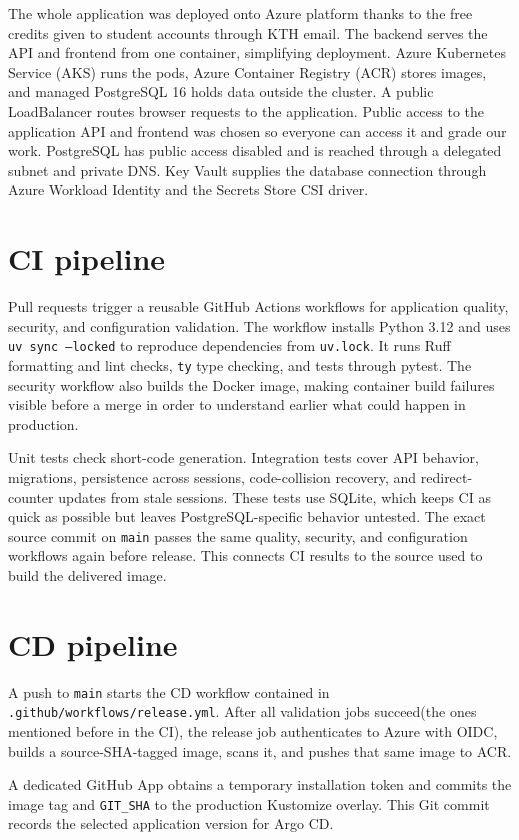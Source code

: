 \documentclass[10pt,a4paper]{article}
\newcommand{\file}[1]{\texttt{\nolinkurl{#1}}}
\begin{document}
The whole application was deployed onto Azure platform thanks to the free credits given to student accounts through KTH email.
The backend serves the API and frontend from one container, simplifying deployment. 
Azure Kubernetes Service (AKS) runs the pods, Azure Container Registry (ACR) stores images, and managed PostgreSQL 16 holds data outside the cluster.
A public LoadBalancer routes browser requests to the application. Public access to the application API and frontend was chosen so everyone can access it and grade our work.
PostgreSQL has public access disabled and is reached through a delegated subnet and private DNS. 
Key Vault supplies the database connection through Azure Workload Identity and the Secrets Store CSI driver.

\section{CI pipeline}
Pull requests trigger a reusable GitHub Actions workflows for application quality, security, and configuration validation. 
The workflow installs Python 3.12 and uses \texttt{uv sync --locked} to reproduce dependencies from \file{uv.lock}. 
It runs Ruff formatting and lint checks, \texttt{ty} type checking, and tests through pytest.
The security workflow also builds the Docker image, making container build failures visible before a merge in order to understand earlier what could happen in production.

Unit tests check short-code generation. 
Integration tests cover API behavior, migrations, persistence across sessions, code-collision recovery, and redirect-counter updates from stale sessions.
These tests use SQLite, which keeps CI as quick as possible but leaves PostgreSQL-specific behavior untested.
The exact source commit on \texttt{main} passes the same quality, security, and configuration workflows again before release. 
This connects CI results to the source used to build the delivered image.

\newpage
\section{CD pipeline}
A push to \texttt{main} starts the CD workflow contained in \file{.github/workflows/release.yml}. 
After all validation jobs succeed(the ones mentioned before in the CI), the release job authenticates to Azure with OIDC, 
builds a source-SHA-tagged image, scans it, and pushes that same image to ACR.

A dedicated GitHub App obtains a temporary installation token and commits the image tag and \file{GIT_SHA} to the production Kustomize overlay. 
This Git commit records the selected application version for Argo CD.
\end{document}
